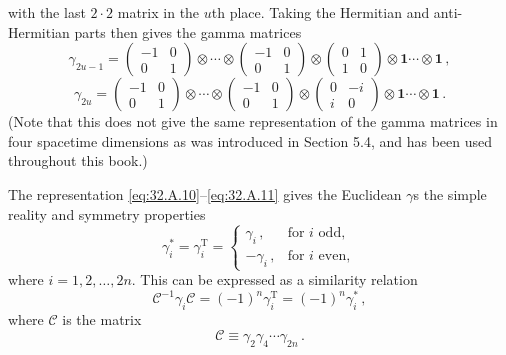 with the last \(2\cdot2\) matrix in the \(u\)th place. Taking the Hermitian
and anti-Hermitian parts then gives the gamma matrices
\begin{equation}
  \gamma_{2u-1}=
  \begin{pmatrix}
    -1&0\\
    0&1
  \end{pmatrix}
  \otimes\cdots\otimes
  \begin{pmatrix}
    -1&0\\
    0&1
  \end{pmatrix}
  \otimes
  \begin{pmatrix}
    0&1\\
    1&0
  \end{pmatrix}
  \otimes\mathbf{1}\cdots\otimes\mathbf{1}\,,
  \tag{32.A.10}\label{eq:32.A.10}
\end{equation}
\begin{equation}
  \gamma_{2u}=
  \begin{pmatrix}
    -1&0\\
    0&1
  \end{pmatrix}
  \otimes\cdots\otimes
  \begin{pmatrix}
    -1&0\\
    0&1
  \end{pmatrix}
  \otimes
  \begin{pmatrix}
    0&-i\\
    i&0
  \end{pmatrix}
  \otimes\mathbf{1}\cdots\otimes\mathbf{1}\,.
  \tag{32.A.11}\label{eq:32.A.11}
\end{equation}
(Note that this does not give the same representation of the gamma matrices
in four spacetime dimensions as was introduced in Section 5.4, and has been
used throughout this book.)

The representation \eqref{eq:32.A.10}--\eqref{eq:32.A.11} gives the
Euclidean \(\gamma\)s the simple reality and symmetry properties
\begin{equation}
  \gamma_i^*=\gamma_i^{\mathrm T}
  =
  \begin{cases}
    \gamma_i\,,&\text{for \(i\) odd},\\
    -\gamma_i\,,&\text{for \(i\) even},
  \end{cases}
  \tag{32.A.12}\label{eq:32.A.12}
\end{equation}
where \(i=1,2,\ldots,2n\). This can be expressed as a similarity relation
\begin{equation}
  \mathcal C^{-1}\gamma_i\mathcal C
  =(-1)^n\gamma_i^{\mathrm T}
  =(-1)^n\gamma_i^*\,,
  \tag{32.A.13}\label{eq:32.A.13}
\end{equation}
where \(\mathcal C\) is the matrix
\begin{equation}
  \mathcal C\equiv\gamma_2\gamma_4\cdots\gamma_{2n}\,.
  \tag{32.A.14}\label{eq:32.A.14}
\end{equation}

